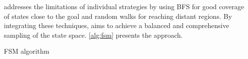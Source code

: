 \bfsrw addresses the limitations of individual strategies by using BFS for good coverage of states close to the goal and random walks for reaching distant regions. By integrating these techniques, \bfsrw aims to achieve a balanced and comprehensive sampling of the state space. \cref{alg:fsm} presents the approach.

\begin{algorithm}[tb]
    \caption{FSM algorithm}
    \label{alg:fsm}

    \SetAlgoLined


\end{algorithm}
